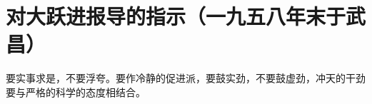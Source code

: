 \section[对大跃进报导的指示（一九五八年末于武昌）]{对大跃进报导的指示（一九五八年末于武昌）}


要实事求是，不要浮夸。要作冷静的促进派，要鼓实劲，不要鼓虚劲，冲天的干劲要与严格的科学的态度相结合。


